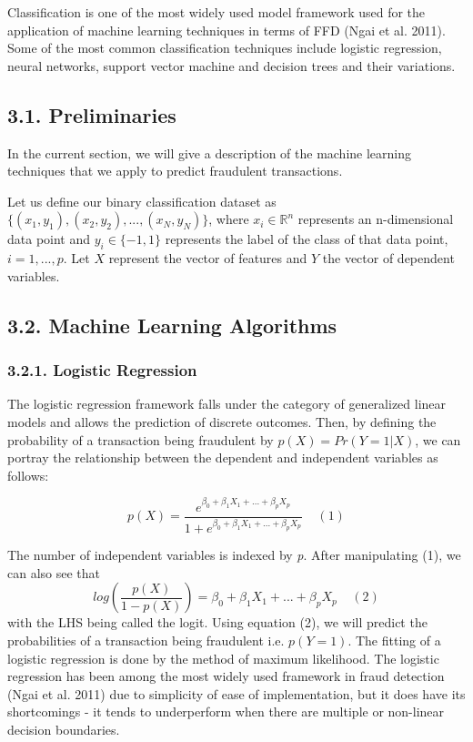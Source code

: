 \documentclass[12pt,]{article}
\begin{document}
Classification is one of the most widely used model framework used for
the application of machine learning techniques in terms of FFD (Ngai et
al. 2011). Some of the most common classification techniques include
logistic regression, neural networks, support vector machine and
decision trees and their variations.

\hypertarget{preliminaries}{%
\subsection{3.1. Preliminaries}\label{preliminaries}}

In the current section, we will give a description of the machine
learning techniques that we apply to predict fraudulent transactions.

Let us define our binary classification dataset as
\({\{(x_1,y_1),(x_2,y_2),...,(x_N,y_N)\}}\), where
\(x_i\in \mathbb{R}^n\) represents an n-dimensional data point and
\(y_i \in \{-1,1\}\) represents the label of the class of that data
point, \(i = 1,...,p\). Let \(X\) represent the vector of features and
\(Y\) the vector of dependent variables.

\hypertarget{machine-learning-algorithms}{%
\subsection{3.2. Machine Learning
Algorithms}\label{machine-learning-algorithms}}

\hypertarget{logistic-regression}{%
\subsubsection{3.2.1. Logistic Regression}\label{logistic-regression}}

The logistic regression framework falls under the category of
generalized linear models and allows the prediction of discrete
outcomes. Then, by defining the probability of a transaction being
fraudulent by \(p(X) = Pr(Y=1|X)\), we can portray the relationship
between the dependent and independent variables as follows:

\[p(X) = \frac{e^{\beta_0 + \beta_1X_1 + ... + \beta_pX_p}}{1 + e^{\beta_0 + \beta_1X_1 + ... + \beta_pX_p}}\;\;\;\;(1)\]

The number of independent variables is indexed by \emph{p}. After
manipulating (1), we can also see that
\[log(\frac{p(X)}{1-p(X)})=\beta_0+ \beta_1X_1 + ... + \beta_pX_p\;\;\;\;(2)\]
with the LHS being called the logit. Using equation (2), we will predict
the probabilities of a transaction being fraudulent i.e. \(p(Y = 1)\).
The fitting of a logistic regression is done by the method of maximum
likelihood. The logistic regression has been among the most widely used
framework in fraud detection (Ngai et al. 2011) due to simplicity of
ease of implementation, but it does have its shortcomings - it tends to
underperform when there are multiple or non-linear decision boundaries.
\end{document}
